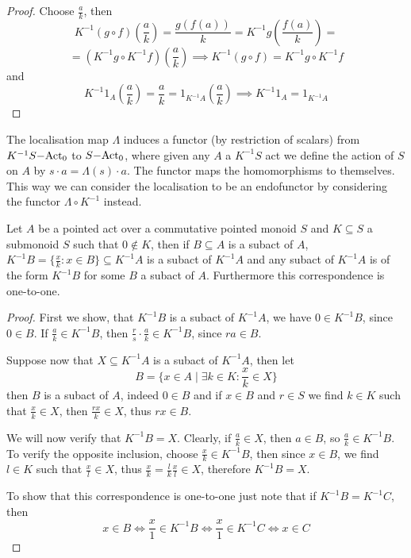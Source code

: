 \begin{proof}[Proof]
    Choose $\frac{a}{k}$, then
    \[
    K^{-1}(g\circ f)\left(\frac{a}{k}\right) = \frac{g(f(a))}{k} = K^{-1}g\left(\frac{f(a)}{k}\right) =\] \[=(K^{-1}g\circ K^{-1}f)(\frac{a}{k}) \implies K^{-1}(g\circ f) = K^{-1}g\circ K^{-1}f
    \]
    and 
    \[
        K^{-1}1_A\left(\frac{a}{k}\right) = \frac{a}{k} = 1_{K^{-1}A}(\frac{a}{k}) \implies K^{-1}1_A = 1_{K^{-1}A}
    \]
\end{proof}
\begin{remark}
    The localisation map $\Lambda$ induces a functor (by restriction of scalars) from $K^{-1}S\mathrm{-Act}_0$ to $S\mathrm{-Act}_0$, where given any 
    $A$ a $K^{-1}S$ act we define the action of $S$ on $A$ by $s\cdot a = \Lambda(s)\cdot a$. The functor maps the 
    homomorphisms to themselves. This way we can consider the 
    localisation to be an endofunctor by considering the functor $\Lambda\circ K^{-1}$ instead. 
\end{remark}
\begin{proposition}
    Let $A$ be a pointed act over a commutative pointed monoid $S$ and $K\subseteq S$ a submonoid $S$ such that $0\not\in K$, then 
    if $B\subseteq A$ is a subact of $A$, $K^{-1}B = \{\frac{x}{k}: x \in B\}\subseteq K^{-1}A$ is a subact of $K^{-1}A$ and any subact of $K^{-1}A$ is of the form
    $K^{-1} B$ for some $B$ a subact of $A$. Furthermore this correspondence is one-to-one.
\end{proposition}
\begin{proof}
    First we show, that $K^{-1}B$ is a subact of $K^{-1}A$, we have $0\in K^{-1}B$, since $0\in B$. If $\frac{a}{k}\in K^{-1}B$, 
    then $\frac{r}{s}\cdot \frac{a}{k}\in K^{-1}B$, since $ra\in B$. \par 
    Suppose now that $X\subseteq K^{-1}A$ is a subact of $K^{-1}A$, then let \[B=\{x\in A \mid \exists k \in K : \frac{x}{k}\in X \}\]
    then $B$ is a subact of $A$, indeed $0\in B$ and if $x\in B$ and $r\in S$ we find $k\in K$ such that $\frac{x}{k}\in X$, then 
    $\frac{rx}{k}\in X$, thus $rx\in B$.\par 
    We will now verify that $K^{-1}B = X$. Clearly, if $\frac{a}{k}\in X$, then $a\in B$, so $\frac{a}{k}\in K^{-1}B$. To verify 
    the opposite inclusion, choose $\frac{x}{k}\in K^{-1}B$, then since $x\in B$, we find $l\in K$ such that $\frac{x}{l}\in X$, thus
    $\frac{x}{k} = \frac{l}{k}\frac{x}{l}\in X$, therefore $K^{-1}B = X$. \par 
    To show that this correspondence is one-to-one just note that if $K^{-1}B=K^{-1}C$, then 
    \[
        x\in B \iff \frac{x}{1}\in K^{-1}B \iff \frac{x}{1} \in K^{-1} C \iff x\in C
    \]
\end{proof}
